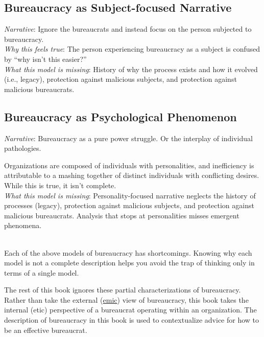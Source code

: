 \subsection*{Bureaucracy as Subject-focused Narrative}
\textit{Narrative}: Ignore the bureaucrats and instead focus on the person subjected to bureaucracy. \\
\textit{Why this feels true}: The person experiencing bureaucracy as a subject is confused by ``why isn't this easier?''  \\
\textit{What this model is missing}: History of why the process exists and how it evolved (i.e., legacy), protection against malicious subjects, and protection against malicious bureaucrats. 


\subsection*{Bureaucracy as Psychological Phenomenon}

\textit{Narrative}: Bureaucracy as a pure power struggle. Or the interplay of individual pathologies. 

Organizations are composed of individuals with personalities, and inefficiency is attributable to a mashing together of distinct individuals with conflicting desires.
While this is true, it isn't complete. \\
\textit{What this model is missing}: Personality-focused narrative neglects the history of processes (legacy), protection against malicious subjects, and protection against malicious bureaucrats. Analysis that stops at personalities misses emergent phenomena. %

\ \\

Each of the above models of bureaucracy has shortcomings. Knowing why each model is not a complete description helps you avoid the trap of thinking only in terms of a single model. 

The rest of this book ignores these partial characterizations of bureaucracy. 
Rather than take the external (\href{https://en.wikipedia.org/wiki/Emic_and_etic}{emic}) 
view of bureaucracy, this book takes the internal (etic) perspective of a bureaucrat operating within an organization. 
The description of bureaucracy in this book is used to contextualize advice for how to be an effective bureaucrat. 